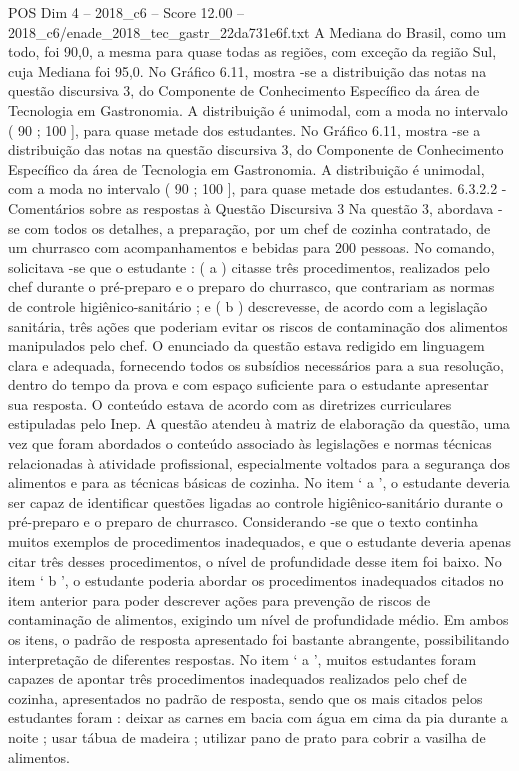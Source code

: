 \begin{textsample}{POS Dim 4 – 2018\_c6 – Score 12.00 – 2018\_c6/enade\_2018\_tec\_gastr\_22da731e6f.txt}
A Mediana do Brasil, como um todo, foi 90,0, a mesma para quase todas as regiões, com exceção da região Sul, cuja Mediana foi 95,0.
No Gráfico 6.11, mostra -se a distribuição das notas na questão discursiva 3, do Componente de Conhecimento Específico da área de Tecnologia em Gastronomia.
A distribuição é unimodal, com a moda no intervalo ( 90 ; 100 ], para quase metade dos estudantes.
No Gráfico 6.11, mostra -se a distribuição das notas na questão discursiva 3, do Componente de Conhecimento Específico da área de Tecnologia em Gastronomia.
A distribuição é unimodal, com a moda no intervalo ( 90 ; 100 ], para quase metade dos estudantes. 6.3.2.2 - Comentários sobre as respostas à Questão Discursiva 3 Na questão 3, abordava -se com todos os detalhes, a preparação, por um chef de cozinha contratado, de um churrasco com acompanhamentos e bebidas para 200 pessoas.
No comando, solicitava -se que o estudante : ( a ) citasse três procedimentos, realizados pelo chef durante o pré-preparo e o preparo do churrasco, que contrariam as normas de controle higiênico-sanitário ; e ( b ) descrevesse, de acordo com a legislação sanitária, três ações que poderiam evitar os riscos de contaminação dos alimentos manipulados pelo chef.
O enunciado da questão estava redigido em linguagem clara e adequada, fornecendo todos os subsídios necessários para a sua resolução, dentro do tempo da prova e com espaço suficiente para o estudante apresentar sua resposta.
O conteúdo estava de acordo com as diretrizes curriculares estipuladas pelo Inep.
A questão atendeu à matriz de elaboração da questão, uma vez que foram abordados o conteúdo associado às legislações e normas técnicas relacionadas à atividade profissional, especialmente voltados para a segurança dos alimentos e para as técnicas básicas de cozinha.
No item ‘ a ’, o estudante deveria ser capaz de identificar questões ligadas ao controle higiênico-sanitário durante o pré-preparo e o preparo de churrasco.
Considerando -se que o texto continha muitos exemplos de procedimentos inadequados, e que o estudante deveria apenas citar três desses procedimentos, o nível de profundidade desse item foi baixo.
No item ‘ b ’, o estudante poderia abordar os procedimentos inadequados citados no item anterior para poder descrever ações para prevenção de riscos de contaminação de alimentos, exigindo um nível de profundidade médio.
Em ambos os itens, o padrão de resposta apresentado foi bastante abrangente, possibilitando interpretação de diferentes respostas.
No item ‘ a ’, muitos estudantes foram capazes de apontar três procedimentos inadequados realizados pelo chef de cozinha, apresentados no padrão de resposta, sendo que os mais citados pelos estudantes foram : deixar as carnes em bacia com água em cima da pia durante a noite ; usar tábua de madeira ; utilizar pano de prato para cobrir a vasilha de alimentos.

\end{textsample}

